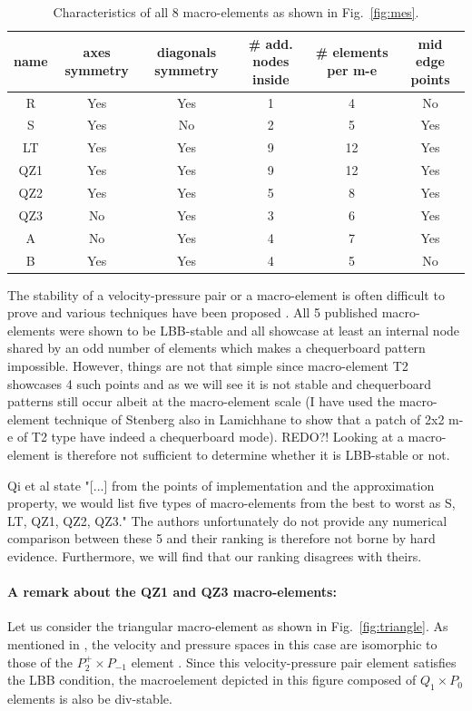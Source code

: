 \documentclass[a4paper]{article}
\begin{document}
\begin{table}
\centering
\begin{tabular}{cccccc}
\hline
{name} & {axes symmetry}  & {diagonals symmetry} & {\# add. nodes inside} 
& {\# elements per m-e} & {mid edge points}  \\
\hline
\hline
R   &  Yes &  Yes & 1  & 4 & No \\
S   &  Yes &   No & 2  & 5 & Yes \\
LT  &  Yes &  Yes & 9 & 12 & Yes \\
QZ1 &  Yes &  Yes & 9 & 12 & Yes \\
QZ2 &  Yes &  Yes & 5 & 8  & Yes \\
QZ3 &  No  &  Yes & 3 & 6  & Yes \\
A   &  No  &  Yes & 4 & 7  & Yes \\
B   &  Yes &  Yes & 4 & 5  & No  \\
\hline
\end{tabular}
\caption{Characteristics of all 8 macro-elements as shown in Fig.~\ref{fig:mes}.\label{tab1}}%
\end{table}

The stability of a velocity-pressure pair or a macro-element is often difficult to prove 
and various techniques have been proposed \cite{bobf13}. 
All 5 published macro-elements were shown to be LBB-stable and all showcase at least 
an internal node shared by an odd number of elements which makes a chequerboard pattern impossible. 
However, things are not that simple since macro-element T2 showcases 
4 such points and as we will see it is not stable and chequerboard patterns still occur 
albeit at the macro-element scale (I have used the macro-element technique of Stenberg 
also in Lamichhane to show that a patch of 2x2 m-e of T2 type have indeed a chequerboard mode). {\color{red} REDO?!}
Looking at a macro-element is therefore not sufficient to determine whether it is LBB-stable or not. 

Qi et al \cite{qizh07} state "[...] from the points of implementation and the approximation property, we 
would list five types of macro-elements from the best to worst as S, LT, QZ1, QZ2, QZ3." 
The authors unfortunately do not provide any numerical comparison between these 5 and their 
ranking is therefore not borne by hard evidence. Furthermore, we will find that our ranking disagrees with theirs. 

\paragraph{A remark about the QZ1 and QZ3 macro-elements:}
Let us consider the triangular macro-element as shown in Fig.~\ref{fig:triangle}.
As mentioned in \cite{rovira1992}, 
the velocity and pressure spaces in this case are isomorphic to those
of the $P_2^+ \times P_{-1}$ element \cite{thba25}. Since this velocity-pressure pair 
element satisfies the LBB condition, the macroelement depicted in this figure
composed of $Q_1 \times P_0$ elements is also be div-stable.
\end{document}

